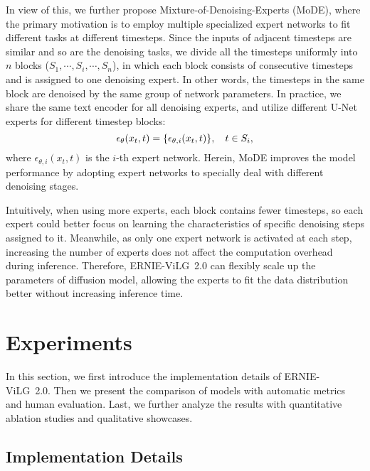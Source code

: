\documentclass[10pt,twocolumn,letterpaper]{article}
\begin{document}
In view of this, we further propose Mixture-of-Denoising-Experts (MoDE), where the primary motivation is to employ multiple specialized expert networks to fit different tasks at different timesteps.
Since the inputs of adjacent timesteps are similar and so are the denoising tasks, we divide all the timesteps uniformly into $n$ blocks ($S_1, \cdots ,S_i, \cdots ,S_n$), in which each block consists of consecutive timesteps and is assigned to one denoising expert. In other words, the timesteps in the same block are denoised by the same group of network parameters.
In practice, we share the same text encoder for all denoising experts, and utilize different U-Net experts for different timestep blocks:
\begin{equation}
\small
    \epsilon_\theta(x_t, t) = \{\epsilon_{\theta,i}(x_t, t)\}, \quad t \in S_i, 
\end{equation}
where $\epsilon_{\theta,i}(x_t, t)$ is the $i$-th expert network.
Herein, MoDE improves the model performance by adopting expert networks to specially deal with different denoising stages.

Intuitively, when using more experts, each block contains fewer timesteps, so each expert could better focus on learning the characteristics of specific denoising steps assigned to it.
Meanwhile, as only one expert network is activated at each step, increasing the number of experts does not affect the computation overhead during inference. 
Therefore, ERNIE-ViLG~2.0 can flexibly scale up the parameters of diffusion model, allowing the experts to fit the data distribution better without increasing inference time.



\section{Experiments}

In this section, we first introduce the implementation details of ERNIE-ViLG~2.0. Then we present the comparison of models with automatic metrics and human evaluation. Last, we further analyze the results with quantitative ablation studies and qualitative showcases.

\subsection{Implementation Details}
\end{document}
